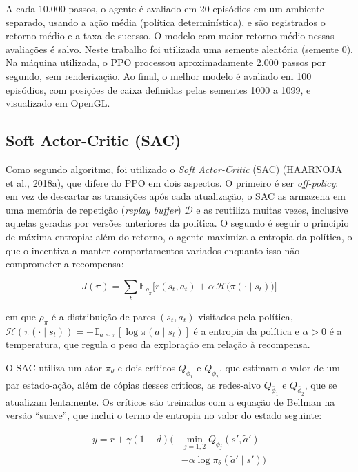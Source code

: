 \documentclass[conference]{IEEEtran}
\begin{document}
A cada 10.000 passos, o agente é avaliado em 20 episódios em um ambiente separado, usando a ação média (política determinística), e são registrados o retorno médio e a taxa de sucesso. O modelo com maior retorno médio nessas avaliações é salvo. Neste trabalho foi utilizada uma semente aleatória (semente 0). Na máquina utilizada, o PPO processou aproximadamente 2.000 passos por segundo, sem renderização. Ao final, o melhor modelo é avaliado em 100 episódios, com posições de caixa definidas pelas sementes 1000 a 1099, e visualizado em OpenGL.

\subsection{Soft Actor-Critic (SAC)}
\label{sec:sac}

Como segundo algoritmo, foi utilizado o \textit{Soft Actor-Critic} (SAC) (HAARNOJA et al., 2018a), que difere do PPO em dois aspectos. O primeiro é ser \textit{off-policy}: em vez de descartar as transições após cada atualização, o SAC as armazena em uma memória de repetição (\textit{replay buffer}) $\mathcal{D}$ e as reutiliza muitas vezes, inclusive aquelas geradas por versões anteriores da política. O segundo é seguir o princípio de máxima entropia: além do retorno, o agente maximiza a entropia da política, o que o incentiva a manter comportamentos variados enquanto isso não comprometer a recompensa:

\begin{equation}
    J(\pi) = \sum_{t} \mathbb{E}_{\rho_\pi} \Big[ r(s_t, a_t) + \alpha \, \mathcal{H}\big(\pi(\cdot \mid s_t)\big) \Big]
    \label{eq:sac_objetivo}
\end{equation}

\noindent em que $\rho_\pi$ é a distribuição de pares $(s_t, a_t)$ visitados pela política, $\mathcal{H}(\pi(\cdot \mid s_t)) = -\mathbb{E}_{a \sim \pi}[\log \pi(a \mid s_t)]$ é a entropia da política e $\alpha > 0$ é a temperatura, que regula o peso da exploração em relação à recompensa.

O SAC utiliza um ator $\pi_\theta$ e dois críticos $Q_{\phi_1}$ e $Q_{\phi_2}$, que estimam o valor de um par estado-ação, além de cópias desses críticos, as redes-alvo $Q_{\bar{\phi}_1}$ e $Q_{\bar{\phi}_2}$, que se atualizam lentamente. Os críticos são treinados com a equação de Bellman na versão ``suave'', que inclui o termo de entropia no valor do estado seguinte:

\begin{equation}
    \begin{aligned}
        y = r + \gamma (1 - d) \Big( & \min_{j=1,2} Q_{\bar{\phi}_j}(s', \tilde{a}') \\
        & - \alpha \log \pi_\theta(\tilde{a}' \mid s') \Big)
    \end{aligned}
    \label{eq:sac_alvo}
\end{equation}
\end{document}
